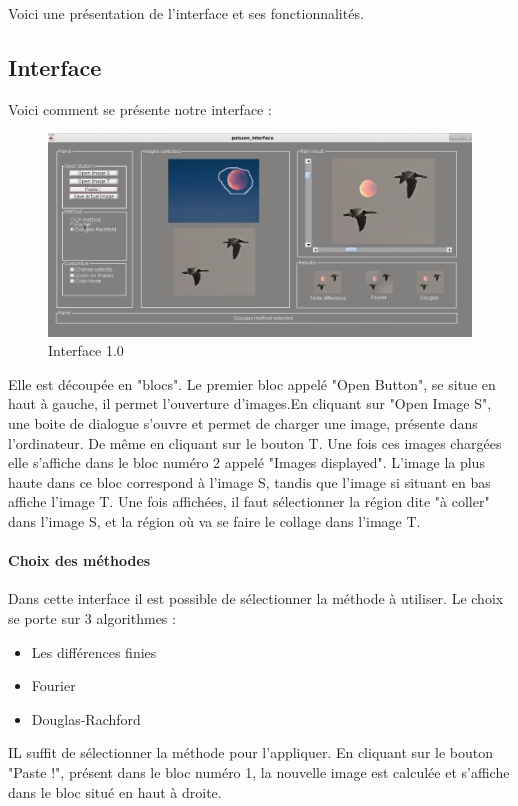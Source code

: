 Voici une présentation de l'interface et ses fonctionnalités.

\subsection{Interface}
Voici comment se présente notre interface : 
\begin{figure}[!h]
    \centering
    \includegraphics[scale = 0.3]{Images/interface.png}
    \caption{Interface 1.0}
\end{figure}{}
Elle est découpée en "blocs". Le premier bloc appelé "Open Button", se situe en haut à gauche, il permet l'ouverture d'images.En cliquant sur "Open Image S", une boite de dialogue s'ouvre et permet de charger une image, présente dans l'ordinateur. De même en cliquant sur le bouton T. Une fois ces images chargées elle s'affiche dans le bloc numéro 2 appelé "Images displayed". L'image la plus haute dans ce bloc correspond à l'image S, tandis que l'image si situant en bas affiche l'image T. Une fois affichées, il faut sélectionner la région dite "à coller" dans l'image S,  et la région où va se faire le collage dans l'image T.\\

\paragraph{Choix des méthodes}
Dans cette interface il est possible de sélectionner la méthode à utiliser. Le choix se porte sur 3 algorithmes : 
\begin{itemize}
    \item Les différences finies
    \item Fourier 
    \item Douglas-Rachford
\end{itemize}{}
IL suffit de sélectionner la méthode pour l'appliquer.
En cliquant sur le bouton "Paste !", présent dans le bloc numéro 1, la nouvelle image est calculée et s'affiche dans le bloc situé en haut à droite. 
